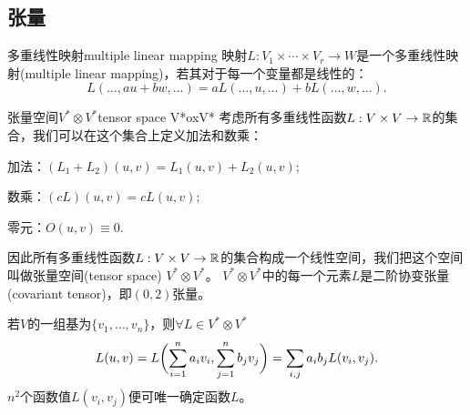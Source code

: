 \subsection{张量}
\begin{definition}{多重线性映射}{multiple linear mapping}
	映射$L:V_1\times\cdots\times V_r\to W$是一个多重线性映射(multiple linear mapping)，若其对于每一个变量都是线性的：
	\[
		L(\ldots,au+bw,\ldots)=aL(\ldots,u,\ldots)+bL(\ldots,w,\ldots).
	\]
\end{definition}
\begin{definition}{张量空间$V^\ast\otimes V^\ast$}{tensor space V*oxV*}
	考虑所有多重线性函数$L:V\times V\to\mathbb R$的集合，我们可以在这个集合上定义加法和数乘：
	\begin{compactitem}
		\item 加法：$(L_1+L_2)(u,v)=L_1(u,v)+L_2(u,v);$
		\item 数乘：$(cL)(u,v)=cL(u,v);$
		\item 零元：$O(u,v)\equiv 0.$
	\end{compactitem}
	因此所有多重线性函数$L:V\times V\to\mathbb R$的集合构成一个线性空间，我们把这个空间叫做张量空间(tensor space) $V^\ast\otimes V^\ast$。
	$V^\ast\otimes V^\ast$中的每一个元素$L$是二阶协变张量(covariant tensor)，即$(0,2)$张量。
\end{definition}
若$V$的一组基为$\{v_1,\ldots,v_n\}$，则$\forall L\in V^\ast\otimes V^\ast$ 
\[
	L(u,v)=L\biggl(\sum_{i=1}^na_iv_i,\sum_{j=1}^nb_jv_j\biggr)=\sum_{i,j}a_ib_jL(v_i,v_j).
\]
$n^2$个函数值$L(v_i,v_j)$便可唯一确定函数$L$。

